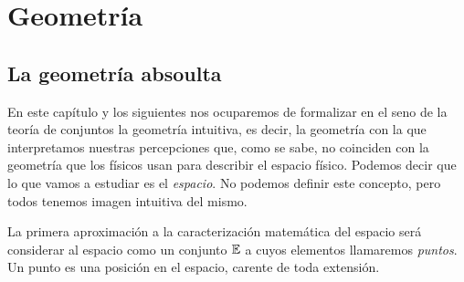 \chapter{Geometría}
\section{La geometría absoulta}
En este capítulo y los siguientes nos ocuparemos de formalizar en el seno
de la teoría de conjuntos la geometría intuitiva, es decir, la geometría
con la que interpretamos nuestras percepciones que, como se sabe, no
coinciden con la geometría que los físicos usan para describir el espacio
físico. Podemos decir que lo que vamos a estudiar es el \emph{espacio}. No
podemos definir este concepto, pero todos tenemos imagen intuitiva del
mismo.

La primera aproximación a la caracterización matemática del espacio será
considerar al espacio como un conjunto $\mathbb{E}$ a cuyos elementos llamaremos
\emph{puntos}. Un punto es una posición en el espacio, carente de toda
extensión.

